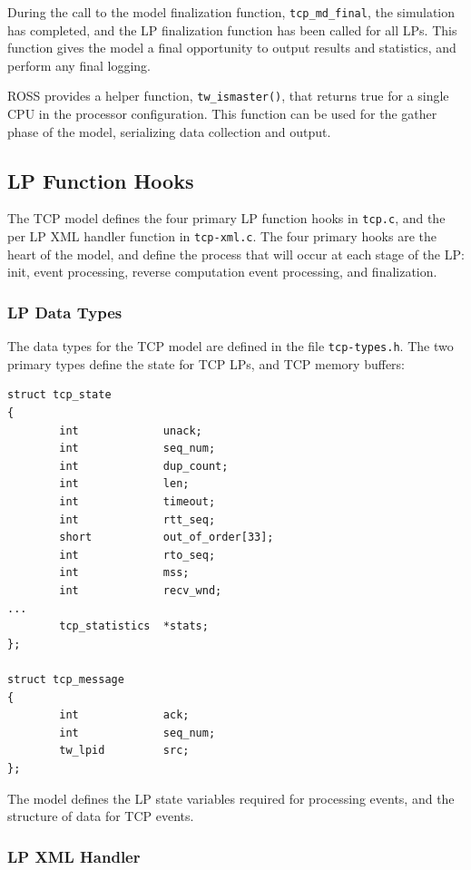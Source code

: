 \documentclass[12pt]{article}
\begin{document}
During the call to the model finalization function, {\tt tcp\_md\_final}, the
simulation has completed, and the LP finalization function has been called for
all LPs.  This function gives the model a final opportunity to output results
and statistics, and perform any final logging.

ROSS provides a helper function, {\tt tw\_ismaster()}, that returns true for a
 single CPU in the processor configuration.  This function can be used for the
 gather phase of the model, serializing data collection and output.

\subsection{LP Function Hooks}

The TCP model defines the four primary LP function hooks in {\tt tcp.c}, and
the per LP XML handler function in {\tt tcp-xml.c}.  The four primary hooks
are the heart of the model, and define the process that will occur at each
stage of the LP: init, event processing, reverse computation event processing,
and finalization.

\subsubsection{LP Data Types}

The data types for the TCP model are defined in the file {\tt tcp-types.h}.
The two primary types define the state for TCP LPs, and TCP memory buffers:

\begin{small}
\begin{verbatim}
struct tcp_state
{
        int             unack;
        int             seq_num;
        int             dup_count;
        int             len;
        int             timeout;
        int             rtt_seq;
        short           out_of_order[33];
        int             rto_seq;
        int             mss;
        int             recv_wnd;
...
        tcp_statistics  *stats;
};

struct tcp_message
{
        int             ack;
        int             seq_num;
        tw_lpid         src;
};
\end{verbatim}
\end{small}

The model defines the LP state variables required for processing events, and
 the structure of data for TCP events.
 
\subsubsection{LP XML Handler}
\end{document}
